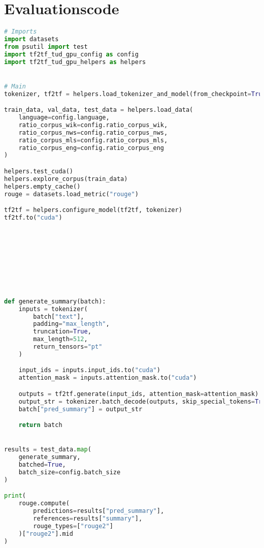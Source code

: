 \section*{Evaluationscode}
\begin{lstlisting}[language=Python, caption=Evaluationscode]
# Imports
import datasets
from psutil import test
import tf2tf_tud_gpu_config as config
import tf2tf_tud_gpu_helpers as helpers


# Main
tokenizer, tf2tf = helpers.load_tokenizer_and_model(from_checkpoint=True)

train_data, val_data, test_data = helpers.load_data(
    language=config.language,
    ratio_corpus_wik=config.ratio_corpus_wik,
    ratio_corpus_nws=config.ratio_corpus_nws,
    ratio_corpus_mls=config.ratio_corpus_mls,
    ratio_corpus_eng=config.ratio_corpus_eng
)

helpers.test_cuda()
helpers.explore_corpus(train_data)
helpers.empty_cache()
rouge = datasets.load_metric("rouge")

tf2tf = helpers.configure_model(tf2tf, tokenizer)
tf2tf.to("cuda")









def generate_summary(batch):
    inputs = tokenizer(
        batch["text"],
        padding="max_length",
        truncation=True,
        max_length=512,
        return_tensors="pt"
    )

    input_ids = inputs.input_ids.to("cuda")
    attention_mask = inputs.attention_mask.to("cuda")

    outputs = tf2tf.generate(input_ids, attention_mask=attention_mask)
    output_str = tokenizer.batch_decode(outputs, skip_special_tokens=True)
    batch["pred_summary"] = output_str

    return batch


results = test_data.map(
    generate_summary,
    batched=True,
    batch_size=config.batch_size
)

print(
    rouge.compute(
        predictions=results["pred_summary"],
        references=results["summary"],
        rouge_types=["rouge2"]
    )["rouge2"].mid
)
\end{lstlisting}
\newpage


